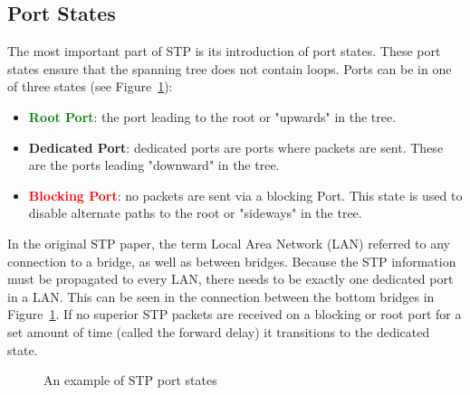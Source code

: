 \subsection*{Port States}
The most important part of STP is its introduction of port states.
These port states ensure that the spanning tree does not contain loops.
Ports can be in one of three states (see Figure~\ref{fig:port_states}):
\begin{itemize}
    \item \textcolor{green}{\textbf{Root Port}}: the port leading to the root or "upwards" in the tree.
    \item \textcolor{blue!80}{\textbf{Dedicated Port}}: dedicated ports are ports where packets are sent. These are the ports leading "downward" in the tree.
    \item \textcolor{red}{\textbf{Blocking Port}}: no packets are sent via a blocking Port.
        This state is used to disable alternate paths to the root or "sideways" in the tree.
\end{itemize}
In the original STP paper\cite{perlman85}, the term Local Area Network (LAN) referred to any connection to a bridge, as well as between bridges.
Because the STP information must be propagated to every LAN, there needs to be exactly one dedicated port in a LAN.
This can be seen in the connection between the bottom bridges in Figure~\ref{fig:port_states}.
If no superior STP packets are received on a blocking or root port for a set amount of time (called the forward delay) it transitions to the dedicated state.
\begin{figure}[h]
    \centering
    \caption{An example of STP port states}
    \label{fig:port_states}
\end{figure}

